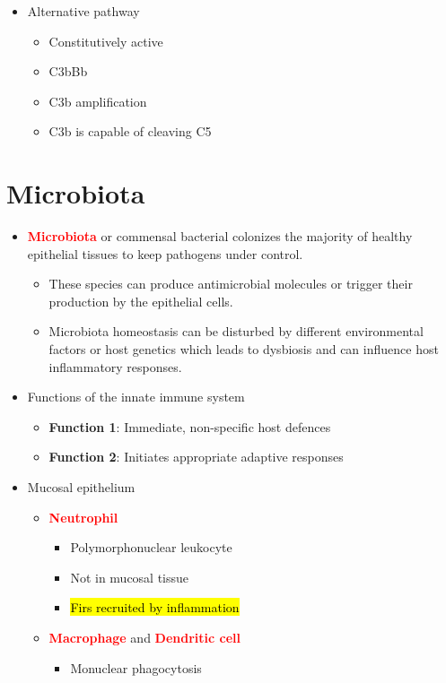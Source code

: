 \documentclass[a4paper, 12pt]{article}
\begin{document}
\begin{itemize}
\item{Alternative pathway}
\begin{itemize}
\item{Constitutively active}
\item{C3bBb}
\item{C3b amplification}
\item{C3b is capable of cleaving C5}
\end{itemize}
\end{itemize}

\section{Microbiota}
\begin{itemize}
\item{\textcolor{red}{\textbf{Microbiota}} or commensal bacterial colonizes the majority of healthy epithelial tissues to keep pathogens under control.}
\begin{itemize}
\item{These species can produce antimicrobial molecules or trigger their production by the epithelial cells.}
\item{Microbiota homeostasis can be disturbed by different environmental factors or host genetics which leads to dysbiosis and can influence host inflammatory responses.}
\end{itemize}
\item{Functions of the innate immune system}
\begin{itemize}
\item{\textbf{Function 1}: Immediate, non-specific host defences}
\item{\textbf{Function 2}: Initiates appropriate adaptive responses}
\end{itemize}
\item{Mucosal epithelium}
\begin{itemize}
\item{\textcolor{red}{\textbf{Neutrophil}}}
\begin{itemize}
\item{Polymorphonuclear leukocyte}
\item{Not in mucosal tissue}
\item{\hl{Firs recruited by inflammation}}
\end{itemize}
\item{\textcolor{red}{\textbf{Macrophage}} and \textcolor{red}{\textbf{Dendritic cell}}}
\begin{itemize}
\item{Monuclear phagocytosis}

\end{itemize}
\end{itemize}
\end{itemize}
\end{document}
